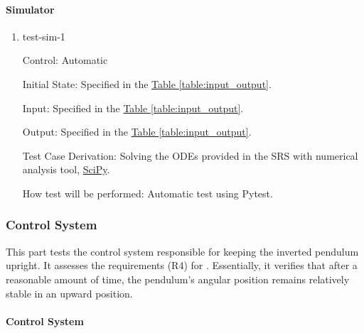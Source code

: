 \documentclass[12pt, titlepage]{article}
\begin{document}
\paragraph{Simulator}

\begin{enumerate}

  \item{test-sim-1\\}

        Control: Automatic

        Initial State: Specified in the \hyperref[table:input_output]{Table \ref*{table:input_output}}.

        Input: Specified in the \hyperref[table:input_output]{Table \ref*{table:input_output}}.

        Output: Specified in the \hyperref[table:input_output]{Table \ref*{table:input_output}}.

        Test Case Derivation: Solving the ODEs provided in the SRS with numerical analysis tool,
        \href{https://scipy.org/}{SciPy}.

        How test will be performed:
        Automatic test using Pytest.

\end{enumerate}

\subsubsection{Control System}

This part tests the control system responsible for keeping
the inverted pendulum upright. It assesses the requirements
(R4) for \progname{}. Essentially, it verifies that after a
reasonable amount of time, the pendulum's angular position
remains relatively stable in an upward position.


\paragraph{Control System}
\end{document}
